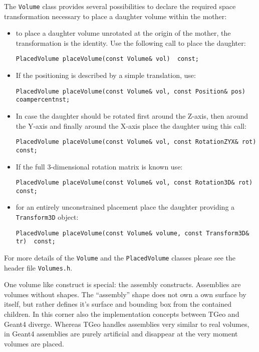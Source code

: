 The {\texttt{Volume}} class provides several possibilities to declare the required space transformation necessary to place a daughter volume  within the mother:
\begin{itemize}
\item to place a daughter volume unrotated at the origin of the mother, the 
transformation is the identity. Use the following call to place the daughter:
\begin{verbatim}
PlacedVolume placeVolume(const Volume& vol)  const;
\end{verbatim}
\item If the positioning is described by a simple translation, use:
\begin{verbatim}
PlacedVolume placeVolume(const Volume& vol, const Position& pos)  coampercentnst;
\end{verbatim}
\item In case the daughter should be rotated first around the Z-axis, then around the Y-axis and finally around the X-axis place the daughter using this call:
\begin{verbatim}
PlacedVolume placeVolume(const Volume& vol, const RotationZYX& rot)  const;
\end{verbatim}
\item If the full 3-dimensional rotation matrix is known use:
\begin{verbatim}
PlacedVolume placeVolume(const Volume& vol, const Rotation3D& rot)  const;
\end{verbatim}
\item for an entirely unconstrained placement place the daughter providing a \texttt{Transform3D} object:
\begin{verbatim}
PlacedVolume placeVolume(const Volume& volume, const Transform3D& tr)  const;
\end{verbatim}
\end{itemize}

For more details of the \texttt{Volume} and the \texttt{PlacedVolume} classes please see the header file \texttt{Volumes.h}.

One volume like construct is special: the assembly constructs. Assemblies are volumes without shapes. The ``assembly'' shape does not own a own surface by itself, but rather defines it's surface and 
bounding box from the contained children. In this corner also the implementation concepts between TGeo and Geant4 diverge. Whereas TGeo handles assemblies very similar to real volumes, in Geant4 assemblies are purely artificial and disappear at the very moment volumes  are placed.

